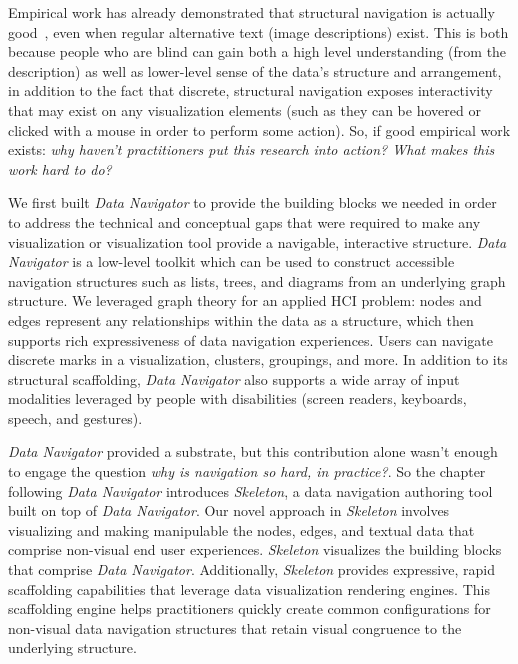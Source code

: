\documentclass[12pt]{cmuthesis}
\begin{document}
Empirical work has already demonstrated that structural navigation is actually good~\cite{Zong2022Rich}, even when regular alternative text (image descriptions) exist. This is both because people who are blind can gain both a high level understanding (from the description) as well as lower-level sense of the data's structure and arrangement, in addition to the fact that discrete, structural navigation exposes interactivity that may exist on any visualization elements (such as they can be hovered or clicked with a mouse in order to perform some action). So, if good empirical work exists: \textit{why haven't practitioners put this research into action? What makes this work hard to do?}

We first built \textit{Data Navigator} to provide the building blocks we needed in order to address the technical and conceptual gaps that were required to make any visualization or visualization tool provide a navigable, interactive structure. \textit{Data Navigator} is a low-level toolkit which can be used to construct accessible navigation structures such as lists, trees, and diagrams from an underlying graph structure. We leveraged graph theory for an applied HCI problem: nodes and edges represent any relationships within the data as a structure, which then supports rich expressiveness of data navigation experiences. Users can navigate discrete marks in a visualization, clusters, groupings, and more. In addition to its structural scaffolding, \textit{Data Navigator} also supports a wide array of input modalities leveraged by people with disabilities (screen readers, keyboards, speech, and gestures).

\textit{Data Navigator} provided a substrate, but this contribution alone wasn't enough to engage the question \textit{why is navigation so hard, in practice?}. So the chapter following \textit{Data Navigator} introduces \textit{Skeleton}, a data navigation authoring tool built on top of \textit{Data Navigator}. Our novel approach in \textit{Skeleton} involves visualizing and making manipulable the nodes, edges, and textual data that comprise non-visual end user experiences. \textit{Skeleton} visualizes the building blocks that comprise \textit{Data Navigator}. Additionally, \textit{Skeleton} provides expressive, rapid scaffolding capabilities that leverage data visualization rendering engines. This scaffolding engine helps practitioners quickly create common configurations for non-visual data navigation structures that retain visual congruence to the underlying structure.
\end{document}
